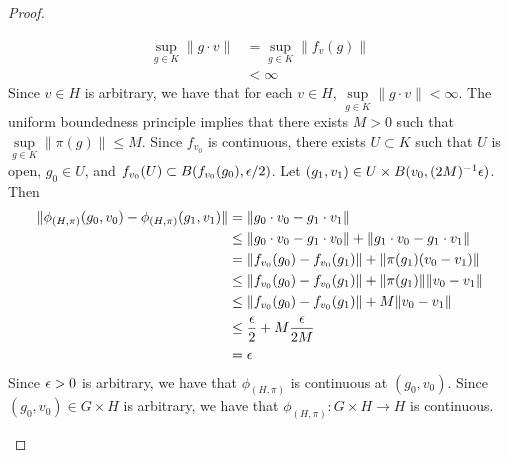 \documentclass{book}
\begin{document}
\begin{proof}
\begin{enumerate}
			\begin{align*}
				\sup\limits_{g \in K} \|g \cdot v\| 
				& = \sup\limits_{g \in K} \|f_v(g)\| \\
				& < \infty
			\end{align*}  
			Since $v \in H$ is arbitrary, we have that for each $v \in H$, $\sup\limits_{g \in K} \|g \cdot v\| < \infty$. The uniform boundedness principle implies that  there exists $M > 0$ such that $\sup\limits_{g \in K} \| \pi(g) \| \leq M$. Since $f_{v_0}$ is continuous, there exists $U \subset K$ such that $U$ is open, $g_0 \in U$, and $f_{v_0}(U) \subset B(f_{v_0}(g_0), \epsilon/2)$. Let $(g_1, v_1) \in U \times B(v_0, (2M)^{-1} \epsilon)$. Then 
			\begin{align*}
				\|\phi_{(H, \pi)}(g_0, v_0) - \phi_{(H, \pi)}(g_1, v_1)\|
				& = \|g_0 \cdot v_0 - g_1 \cdot v_1\| \\
				& \leq 	\|g_0 \cdot v_0 - g_1 \cdot v_0\| + \|g_1 \cdot v_0 - g_1 \cdot v_1\| \\
				& = \|f_{v_0}(g_0) - f_{v_0}(g_1)\| + \|\pi(g_1)(v_0 - v_1)\| \\
				& \leq \|f_{v_0}(g_0) - f_{v_0}(g_1)\| + \|\pi(g_1)\| \|v_0 - v_1\| \\
				& \leq \|f_{v_0}(g_0) - f_{v_0}(g_1)\| + M \|v_0 - v_1\| \\
				& \leq \frac{\epsilon}{2} + M \frac{\epsilon}{2M} \\
				& = \epsilon
			\end{align*}
			Since $\epsilon > 0$ is arbitrary, we have that $\phi_{(H, \pi)}$ is continuous at $(g_0, v_0)$. Since $(g_0, v_0) \in G \times H$ is arbitrary, we have that $\phi_{(H, \pi)}: G \times H \rightarrow H$ is continuous.
		\end{enumerate}
	\end{proof}


	
	
\end{document}

